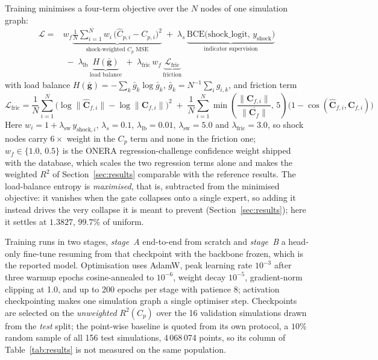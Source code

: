 \documentclass{WCCM-ECCOMAS_2026_Full_Paper}
\begin{document}
Training minimises a four-term objective over the $N$ nodes of one
simulation graph:
\begin{equation}
  \begin{split}
    \mathcal{L} ={}&
      w_f\underbrace{\frac{1}{N}\sum_{i=1}^{N} w_i\,
        \bigl(\hat{C}_{p,i} - C_{p,i}\bigr)^{2}}_{\text{shock-weighted }C_p\text{ MSE}}
      \;+\; \lambda_{s}\,
      \underbrace{\mathrm{BCE}\bigl(\mathrm{shock\_logit},\,
        y_{\mathrm{shock}}\bigr)}_{\text{indicator supervision}} \\[2ex]
    &\;-\; \lambda_{\mathrm{lb}}\,
      \underbrace{H(\bar{\mathbf{g}})}_{\text{load balance}}
      \;+\; \lambda_{\mathrm{fric}}\,w_f\,
      \underbrace{\mathcal{L}_{\mathrm{fric}}}_{\text{friction}}
  \end{split}
  \label{eq:loss}
\end{equation}
with load balance
$H(\bar{\mathbf{g}}) = -\sum_{k}\bar{g}_k\log\bar{g}_k$,
$\bar{g}_k = N^{-1}\sum_i g_{i,k}$, and friction term
\begin{equation}
  \mathcal{L}_{\mathrm{fric}} =
    \frac{1}{N}\sum_{i=1}^{N}
      \bigl(\log\|\hat{\mathbf{C}}_{f,i}\| -
            \log\|\mathbf{C}_{f,i}\|\bigr)^{2}
    \;+\;
    \frac{1}{N}\sum_{i=1}^{N}
      \min\!\left(\frac{\|\mathbf{C}_{f,i}\|}
                       {\overline{\|\mathbf{C}_{f}\|}},\,5\right)
      \bigl(1-\cos(\hat{\mathbf{C}}_{f,i},\mathbf{C}_{f,i})\bigr)
  \label{eq:fric}
\end{equation}
Here $w_i = 1 + \lambda_{\mathrm{sw}}\,y_{\mathrm{shock},i}$,
$\lambda_{s}=0.1$, $\lambda_{\mathrm{lb}}=0.01$,
$\lambda_{\mathrm{sw}}=5.0$ and $\lambda_{\mathrm{fric}}=3.0$, so
shock nodes carry $6\times$ weight in the $C_p$ term and none in the
friction one; $w_f\in\{1.0,\,0.5\}$ is the ONERA regression-challenge
confidence weight shipped with the database, which scales the two
regression terms alone and makes the weighted $R^{2}$ of
Section~\ref{sec:results} comparable with the reference results.  The
load-balance entropy is \emph{maximised}, that is, subtracted from the
minimised objective: it vanishes when the gate collapses onto a single
expert, so adding it instead drives the very collapse it is meant to
prevent (Section~\ref{sec:results}); here it settles at $1.3827$,
$99.7\%$ of uniform.

Training runs in two stages, \emph{stage~A} end-to-end from scratch
and \emph{stage~B} a head-only fine-tune resuming from that checkpoint
with the backbone frozen, which is the reported model.  Optimisation
uses AdamW, peak learning rate $10^{-3}$ after three warmup epochs
cosine-annealed to $10^{-6}$, weight decay $10^{-5}$, gradient-norm
clipping at 1.0, and up to 200 epochs per stage with patience 8;
activation checkpointing makes one simulation graph a single optimiser
step.  Checkpoints are
selected on the \emph{unweighted} $R^{2}(C_p)$ over the 16 validation
simulations drawn from the \emph{test} split; the point-wise baseline
is quoted from its own protocol, a $10\%$ random sample of all 156
test simulations, 4\,068\,074 points, so its column of
Table~\ref{tab:results} is not measured on the same population.
\end{document}
